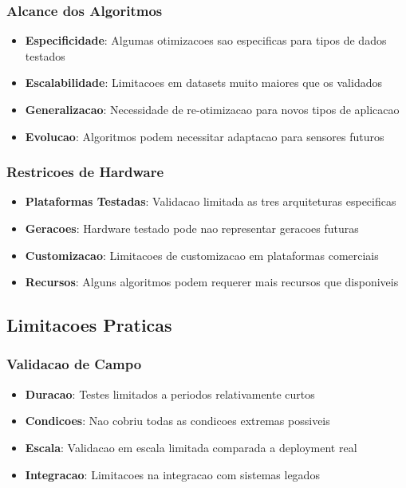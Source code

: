 \subsubsection{Alcance dos Algoritmos}
\begin{itemize}
    \item \textbf{Especificidade}: Algumas otimizacoes sao especificas para tipos de dados testados
    \item \textbf{Escalabilidade}: Limitacoes em datasets muito maiores que os validados
    \item \textbf{Generalizacao}: Necessidade de re-otimizacao para novos tipos de aplicacao
    \item \textbf{Evolucao}: Algoritmos podem necessitar adaptacao para sensores futuros
\end{itemize}

\subsubsection{Restricoes de Hardware}
\begin{itemize}
    \item \textbf{Plataformas Testadas}: Validacao limitada as tres arquiteturas especificas
    \item \textbf{Geracoes}: Hardware testado pode nao representar geracoes futuras
    \item \textbf{Customizacao}: Limitacoes de customizacao em plataformas comerciais
    \item \textbf{Recursos}: Alguns algoritmos podem requerer mais recursos que disponiveis
\end{itemize}

\subsection{Limitacoes Praticas}

\subsubsection{Validacao de Campo}
\begin{itemize}
    \item \textbf{Duracao}: Testes limitados a periodos relativamente curtos
    \item \textbf{Condicoes}: Nao cobriu todas as condicoes extremas possiveis
    \item \textbf{Escala}: Validacao em escala limitada comparada a deployment real
    \item \textbf{Integracao}: Limitacoes na integracao com sistemas legados
\end{itemize}

